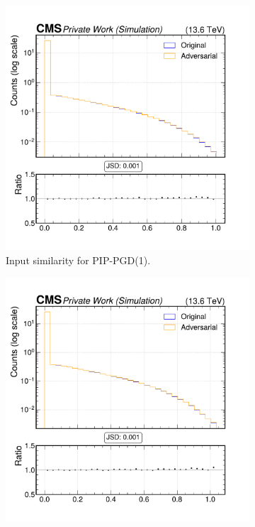 \begin{figure}[h]
  \centering
  \begin{subfigure}[t]{0.32\textwidth}
    \includegraphics[width=\linewidth]{media/output/features/compare/combined_it_1/cmp_vtx_arr_sv_enratio.pdf}
    \caption*{Input similarity for PIP-PGD(1).}
  \end{subfigure}\hfill
  \begin{subfigure}[t]{0.32\textwidth}
    \includegraphics[width=\linewidth]{media/output/features/compare/combined_it_2/cmp_vtx_arr_sv_enratio.pdf}

\end{subfigure}
\end{figure}
